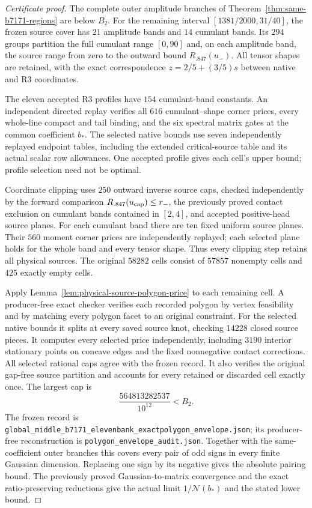 \documentclass{article}
\newcommand{\N}{\mathcal N}
\begin{document}
\begin{proof}[Certificate proof]
The complete outer amplitude branches of
Theorem~\ref{thm:same-b7171-regions} are below $B_2$.
For the remaining interval $[1381/2000,31/40]$, the frozen source cover
has $21$ amplitude bands and $14$ cumulant bands. Its $294$ groups
partition the full cumulant range $[0,90]$ and, on each amplitude band,
the source range from zero to the outward bound $R_{.847}(u_-)$.
All tensor shapes are retained, with the exact correspondence
$z=2/5+(3/5)s$ between native and R3 coordinates.

The eleven accepted R3 profiles have $154$ cumulant-band constants.
An independent directed replay verifies all $616$ cumulant--shape
corner prices, every whole-line compact and tail binding, and the six
spectral matrix gates at the common coefficient $b_*$. The selected
native bounds use seven independently replayed endpoint tables,
including the extended critical-source table and its actual scalar
row allowances. One accepted profile gives each cell's upper bound;
profile selection need not be optimal.

Coordinate clipping uses $250$ outward inverse source caps, checked
independently by the forward comparison $R_{.847}(u_{\rm cap})\le r_-$,
the previously proved contact exclusion on cumulant bands contained
in $[2,4]$, and accepted positive-head source planes. For each cumulant
band there are ten fixed uniform source planes. Their $560$ moment
corner prices are independently replayed; each selected plane holds
for the whole band and every tensor shape. Thus every clipping step
retains all physical sources. The original $58282$ cells consist of
$57857$ nonempty cells and $425$ exactly empty cells.

Apply Lemma~\ref{lem:physical-source-polygon-price} to each remaining
cell. A producer-free exact checker verifies each recorded polygon by
vertex feasibility and by matching every polygon facet to an original
constraint. For the selected native bounds it splits at every saved
source knot, checking $14228$ closed source pieces. It computes every
selected price independently, including $3190$ interior stationary
points on concave edges and the fixed nonnegative contact corrections.
All selected rational caps agree with the frozen record. It also
verifies the original gap-free source partition and accounts for every
retained or discarded cell exactly once. The largest cap is
\[
 \frac{564813282537}{10^{12}}< B_2.
\]
The frozen record is
\texttt{global\_\allowbreak middle\_\allowbreak b7171\_\allowbreak elevenbank\_\allowbreak exactpolygon\_\allowbreak envelope.json};
its producer-free reconstruction is
\texttt{polygon\_\allowbreak envelope\_\allowbreak audit.json}.
Together with the same-coefficient outer branches this covers every
pair of odd signs in every finite Gaussian dimension. Replacing one
sign by its negative gives the absolute pairing bound. The previously
proved Gaussian-to-matrix convergence and the exact ratio-preserving
reductions give the actual limit $1/\N(b_*)$ and the stated lower bound.
\end{proof}
\end{document}
